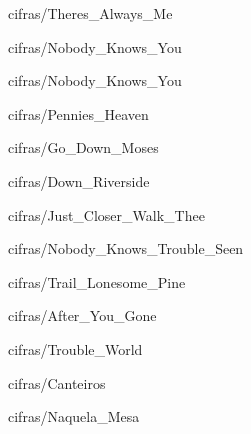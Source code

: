 \documentclass{scrartcl}
\begin{document}

{cifras/Theres_Always_Me}


{cifras/Nobody_Knows_You}


{cifras/Nobody_Knows_You}


{cifras/Pennies_Heaven}


{cifras/Go_Down_Moses}


{cifras/Down_Riverside}


{cifras/Just_Closer_Walk_Thee}


{cifras/Nobody_Knows_Trouble_Seen}


{cifras/Trail_Lonesome_Pine}


{cifras/After_You_Gone}


{cifras/Trouble_World}


{cifras/Canteiros}


{cifras/Naquela_Mesa}

% 

% 

% 
\end{document}
